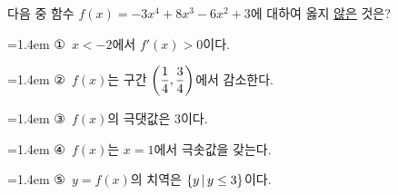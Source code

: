 다음 중 함수 $f(x)=-3x^4+8x^3-6x^2+3$에 대하여 옳지 \underline{않은} 것은?
\par\medskip\par\noindent\hangindent=1.4em {\small ①}\ $x<-2$에서 $f'(x)>0$이다.\par\noindent\hangindent=1.4em {\small ②}\ $f(x)$는 구간 $\left(\dfrac{1}{4}{,}\mkern3mu\mathopen{}\dfrac{3}{4}\right)$에서 감소한다.\par\noindent\hangindent=1.4em {\small ③}\ $f(x)$의 극댓값은 3이다.\par\noindent\hangindent=1.4em {\small ④}\ $f(x)$는 $x=1$에서 극솟값을 갖는다.\par\noindent\hangindent=1.4em {\small ⑤}\ $y=f(x)$의 치역은 $\{y\mkern3mu |\mkern3mu y\le 3\}$이다.\par\medskip
